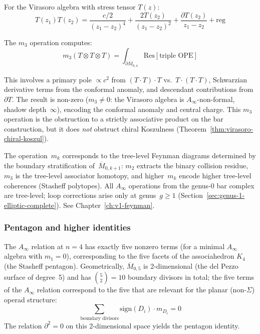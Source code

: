 \begin{example}
For the Virasoro algebra with stress tensor $T(z)$:
\[T(z_1)T(z_2) = \frac{c/2}{(z_1-z_2)^4} + \frac{2T(z_2)}{(z_1-z_2)^2} +
\frac{\partial T(z_2)}{z_1-z_2} + \text{reg}\]

The $m_3$ operation computes:
\[m_3(T \otimes T \otimes T) =
\int_{\partial \overline{M}_{0,4}} \text{Res}[\text{triple OPE}]\]

This involves a primary pole $\propto c^2$ from $(T \cdot T) \cdot T$ vs.\ $T \cdot (T \cdot T)$, Schwarzian derivative terms from the conformal anomaly, and descendant contributions from $\partial T$. The result is non-zero ($m_3 \neq 0$: the Virasoro algebra is $A_\infty$-non-formal, shadow depth~$\infty$), encoding the conformal anomaly
and central charge. This $m_3$ operation is the obstruction to
a strictly associative product on the bar construction, but it does \emph{not} obstruct chiral Koszulness (Theorem~\ref{thm:virasoro-chiral-koszul}).
\end{example}

\begin{remark}
\label{rem:ainfty-feynman-preview}
The operation~$m_k$ corresponds to the tree-level Feynman diagrams
determined by the boundary stratification
of~$\overline{M}_{0,k+1}$: $m_2$ extracts the binary collision
residue, $m_3$ is the tree-level associator homotopy, and
higher~$m_k$ encode higher tree-level coherences (Stasheff
polytopes). All $A_\infty$ operations from the genus-$0$ bar
complex are tree-level; loop corrections arise only at
genus~$g \geq 1$ (Section~\ref{sec:genus-1-elliptic-complete}).
See Chapter~\ref{ch:v1-feynman}.
\end{remark}

\subsubsection{Pentagon and higher identities}

\begin{theorem}\label{thm:pentagon-identity}
The $A_\infty$ relation at $n = 4$ has exactly five nonzero terms (for a minimal
$A_\infty$ algebra with $m_1 = 0$), corresponding to the five facets of the
associahedron $K_4$ (the Stasheff pentagon). Geometrically, $\overline{M}_{0,5}$ is 2-dimensional (the del Pezzo
surface of degree~5) and has $\binom{5}{2} = 10$ boundary divisors in total; the five terms of the $A_\infty$ relation correspond to the five that are relevant for the planar (non-$\Sigma$) operad structure:
\[\sum_{\text{boundary divisors}} \text{sign}(D_i) \cdot m_{D_i} = 0\]
The relation $\partial^2 = 0$ on this 2-dimensional space yields the pentagon identity.
\end{theorem}


